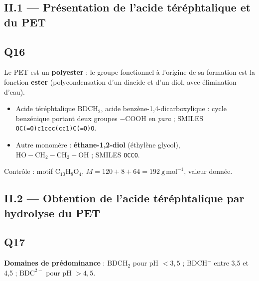 \documentclass[11pt,a4paper]{article}
\providecommand{\tightlist}{\setlength{\itemsep}{0pt}\setlength{\parskip}{0pt}}
\begin{document}
\hypertarget{ii.1-pruxe9sentation-de-lacide-tuxe9ruxe9phtalique-et-du-pet}{%
\subsection{II.1 --- Présentation de l'acide téréphtalique et du PET}\label{ii.1-pruxe9sentation-de-lacide-tuxe9ruxe9phtalique-et-du-pet}}

\hypertarget{q16}{%
\subsection{Q16}\label{q16}}

Le PET est un \textbf{polyester} : le groupe fonctionnel à l'origine de sa formation est la fonction \textbf{ester} (polycondensation d'un diacide et d'un diol, avec élimination d'eau).

\begin{itemize}
\tightlist
\item
  Acide téréphtalique \(\mathrm{BDCH_2}\), acide benzène-\allowbreak{}1,4-\allowbreak{}dicarboxylique : cycle benzénique portant deux groupes \(-\mathrm{COOH}\) en \emph{para} ; SMILES \texttt{OC(\allowbreak{}=\allowbreak{}O)\allowbreak{}c1ccc(\allowbreak{}cc1)\allowbreak{}C(\allowbreak{}=\allowbreak{}O)\allowbreak{}O}.
\item
  Autre monomère : \textbf{éthane-1,2-diol} (éthylène glycol), \(\mathrm{HO{-}CH_2{-}CH_2{-}OH}\) ; SMILES \texttt{OCCO}.
\end{itemize}

Contrôle : motif \(\mathrm{C_{10}H_8O_4}\), \(M=120+8+64=192\ \mathrm{g\,mol^{-1}}\), valeur donnée.

\hypertarget{ii.2-obtention-de-lacide-tuxe9ruxe9phtalique-par-hydrolyse-du-pet}{%
\subsection{II.2 --- Obtention de l'acide téréphtalique par hydrolyse du PET}\label{ii.2-obtention-de-lacide-tuxe9ruxe9phtalique-par-hydrolyse-du-pet}}

\hypertarget{q17}{%
\subsection{Q17}\label{q17}}

\textbf{Domaines de prédominance} : \(\mathrm{BDCH_2}\) pour pH \(<3{,}5\) ; \(\mathrm{BDCH^-}\) entre 3,5 et 4,5 ; \(\mathrm{BDC^{2-}}\) pour pH \(>4{,}5\).
\end{document}
